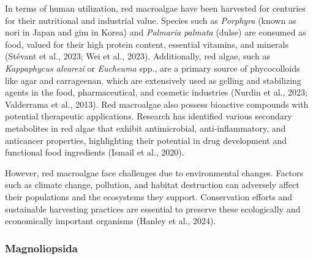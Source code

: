 \documentclass[
  letterpaper,
  11pt,
  english,
  singlespacing,
  headsepline]{MastersDoctoralThesis}
\begin{document}
\begin{spacing}{1.5}
In terms of human utilization, red macroalgae have been harvested for
centuries for their nutritional and industrial value. Species such as
\emph{Porphyra} (known as nori in Japan and gim in Korea) and
\emph{Palmaria palmata} (dulse) are consumed as food, valued for their
high protein content, essential vitamins, and minerals (Stévant et al.,
2023; Wei et al., 2023). Additionally, red algae, such as
\emph{Kappaphycus alvarezi} or \emph{Eucheuma} spp., are a primary
source of phycocolloids like agar and carrageenan, which are extensively
used as gelling and stabilizing agents in the food, pharmaceutical, and
cosmetic industries (Nurdin et al., 2023; Valderrama et al., 2013). Red
macroalgae also possess bioactive compounds with potential therapeutic
applications. Research has identified various secondary metabolites in
red algae that exhibit antimicrobial, anti-inflammatory, and anticancer
properties, highlighting their potential in drug development and
functional food ingredients (Ismail et al., 2020).

However, red macroalgae face challenges due to environmental changes.
Factors such as climate change, pollution, and habitat destruction can
adversely affect their populations and the ecosystems they support.
Conservation efforts and sustainable harvesting practices are essential
to preserve these ecologically and economically important organisms
(Hanley et al., 2024).

\subsubsection{Magnoliopsida}\label{magnoliopsida}


\end{spacing}
\end{document}

